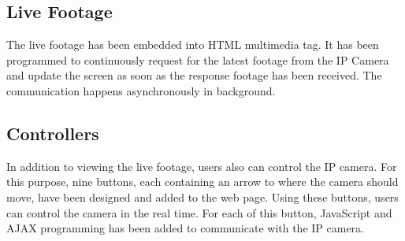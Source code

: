 \subsection*{Live Footage}
The live footage has been embedded into HTML multimedia tag. It has been programmed to continuously request for the latest footage from the IP Camera and update the screen as soon as the response footage has been received. The communication happens asynchronously in background.

\subsection*{Controllers}
In addition to viewing the live footage, users also can control the IP camera. For this purpose, nine buttons, each containing an arrow to where the camera should move, have been designed and added to the web page. Using these buttons, users can control the camera in the real time. For each of this button, JavaScript and AJAX programming has been added to communicate with the IP camera.



